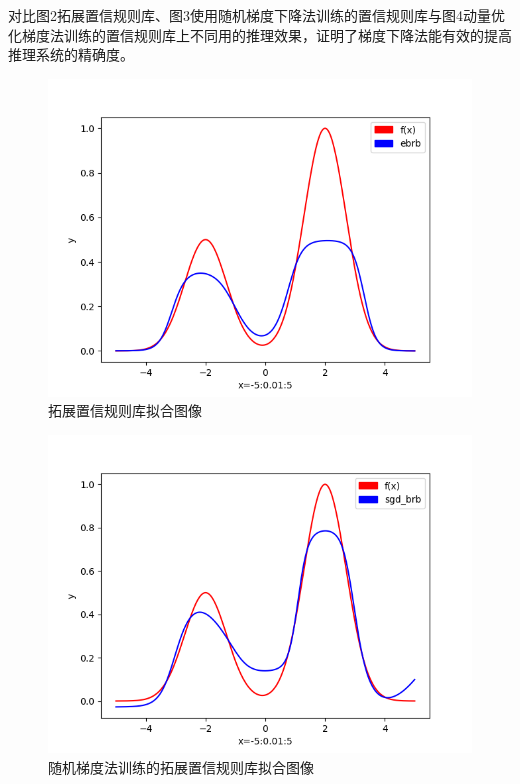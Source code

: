 \documentclass{cjc}
\begin{document}
对比图2拓展置信规则库、图3使用随机梯度下降法训练的置信规则库与图4动量优化梯度法训练的置信规则库上不同用的推理效果，证明了梯度下降法能有效的提高推理系统的精确度。
\begin{figure}
    \includegraphics[width=\linewidth]{ebrb_fit.png}
    \caption{拓展置信规则库拟合图像}
\end{figure}

\begin{figure}
    \includegraphics[width=\linewidth]{sgd_brb_fit.png}
    \caption{随机梯度法训练的拓展置信规则库拟合图像}
\end{figure}
\end{document}
